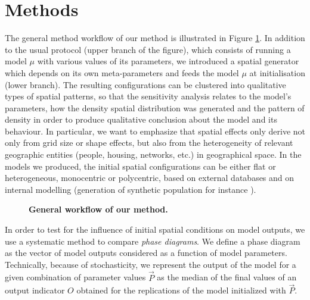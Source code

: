 \documentclass[3p,times,procedia]{elsarticle}
\begin{document}
\section{Methods}

The general method workflow of our method is illustrated in Figure \ref{fig:method}. In addition to the usual protocol (upper branch of the figure), which consists of running a model $\mu$ with various values of its parameters, we introduced a spatial generator which depends on its own meta-parameters and feeds the model $\mu$ at initialisation (lower branch). The resulting configurations can be clustered into qualitative types of spatial patterns, so that the sensitivity analysis relates to the model's parameters, how the density spatial distribution was generated and the pattern of density in order to produce qualitative conclusion about the model and its behaviour. In particular, we want to emphasize that spatial effects only derive not only from grid size or shape effects, but also from the heterogeneity of relevant geographic entities (people, housing, networks, etc.) in geographical space. In the models we produced, the initial spatial configurations  can be either flat or heterogeneous, monocentric or polycentric, based on external databases and on internal modelling (generation of synthetic population for instance \citep{bhat1999activity}).
\begin{figure}[htbp] \begin{center} 
 \caption{\textbf{General workflow of our method.}} \label{fig:method} \end{center} \end{figure} %

In order to test for the influence of initial spatial conditions on model outputs, we use a systematic method to compare \emph{phase diagrams}. We define a phase diagram as the vector of model outputs considered as a function of model parameters. Technically, because of stochasticity, we represent the output of the model for a given combination of parameter values $\vec{P}$ as the median of the final values of an output indicator $O$ obtained for the replications of the model initialized with $\vec{P}$.\\
\end{document}
